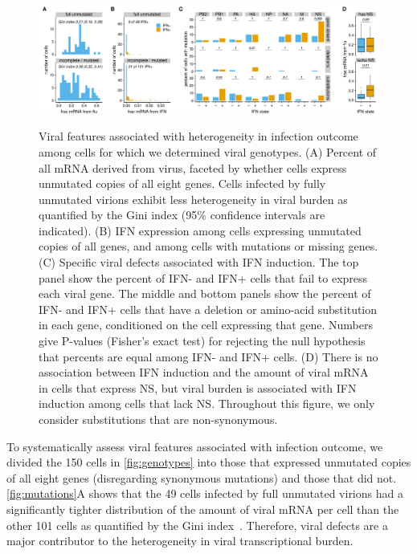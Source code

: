 \documentclass[]{asm-article}
\newcommand{\FIG}[1]{\autoref{fig:#1}}
\begin{document}
\begin{figure}
\begin{fullwidth}
{\centering
\includegraphics[width=\linewidth]{figures/single_cell_figures/p_mutations.pdf}
}
\caption{
Viral features associated with heterogeneity in infection outcome among cells for which we determined viral genotypes.
(A) 
Percent of all mRNA derived from virus, faceted by whether cells express unmutated copies of all eight genes.
Cells infected by fully unmutated virions exhibit less heterogeneity in viral burden as quantified by the Gini index (95\% confidence intervals are indicated).
(B)
IFN expression among cells expressing unmutated copies of all genes, and among cells with mutations or missing genes.
(C)
Specific viral defects associated with IFN induction.
The top panel show the percent of IFN- and IFN+ cells that fail to express each viral gene.
The middle and bottom panels show the percent of IFN- and IFN+ cells that have a deletion or amino-acid substitution in each gene, conditioned on the cell expressing that gene.
Numbers give P-values (Fisher's exact test) for rejecting the null hypothesis that percents are equal among IFN- and IFN+ cells. 
(D)
There is no association between IFN induction and the amount of viral mRNA in cells that express NS, but viral burden is associated with IFN induction among cells that lack NS.
Throughout this figure, we only consider substitutions that are non-synonymous.
}
\label{fig:mutations}

\end{fullwidth}
\end{figure}

To systematically assess viral features associated with infection outcome, we divided the 150 cells in \FIG{genotypes} into those that expressed unmutated copies of all eight genes (disregarding synonymous mutations) and those that did not.
\FIG{mutations}A shows that the 49 cells infected by full unmutated virions had a significantly tighter distribution of the amount of viral mRNA per cell than the other 101 cells as quantified by the Gini index~\cite{gini1921measurement}.
Therefore, viral defects are a major contributor to the heterogeneity in viral transcriptional burden.
\end{document}
